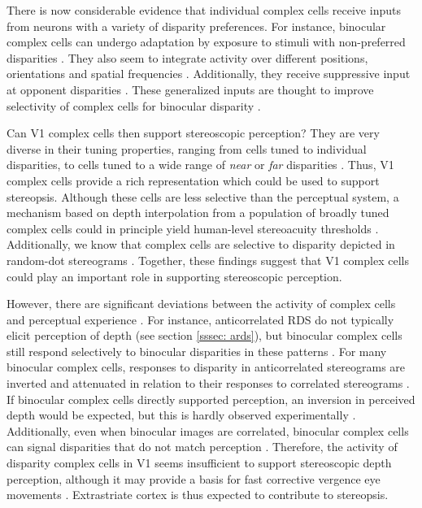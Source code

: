 There is now considerable evidence that individual complex cells receive inputs from neurons with a variety of disparity preferences. For instance, binocular complex cells can undergo adaptation by exposure to stimuli with non-preferred disparities \cite{Duong:2011fk}. They also seem to integrate activity over different positions, orientations and spatial frequencies \cite{Sasaki:2010pi,Baba:2015ij,Kato:2016fk}. Additionally, they receive suppressive input at opponent disparities \cite{Tanabe:2014ud,Tanabe:2011pt,Haefner:2008jg}. These generalized inputs are thought to improve selectivity of complex cells for binocular disparity \cite{Haefner:2008jg,Tanabe:2011pt,Kato:2016fk}.

Can V1 complex cells then support stereoscopic perception? They are very diverse in their tuning properties, ranging from cells tuned to individual disparities, to cells tuned to a wide range of \textit{near} or \textit{far} disparities \cite{Poggio:1977ys,Poggio:1988ij,Prince:2002uq}. Thus, V1 complex cells provide a rich representation which could be used to support stereopsis. Although these cells are less selective than the perceptual system, a mechanism based on depth interpolation from a population of broadly tuned complex cells could in principle yield human-level stereoacuity thresholds \cite{Lehky:1990fk,Lehky1990}. Additionally, we know that complex cells are selective to disparity depicted in random-dot stereograms \cite{Poggio:1984mi,Poggio:1988ij}. Together, these findings suggest that V1 complex cells could play an important role in supporting stereoscopic perception. 

However, there are significant deviations between the activity of complex cells and perceptual experience \cite{Cumming:1997ve, Cumming:2000vn}. For instance, anticorrelated RDS do not typically elicit perception of depth (see section \ref{sssec: ards}), but binocular complex cells still respond selectively to binocular disparities in these patterns \cite{Cumming:1997ve}. For many binocular complex cells, responses to disparity in anticorrelated stereograms are inverted and attenuated in relation to their responses to correlated stereograms \cite{Cumming:1997ve,Samonds:2013cs}. If binocular complex cells directly supported perception, an inversion in perceived depth would be expected, but this is hardly observed experimentally \cite{Cumming:1998ib,Hibbard2014}. Additionally, even when binocular images are correlated, binocular complex cells can signal disparities that do not match perception \cite{Cumming:2000vn,Nienborg:2006qo,Nienborg:2014fu}. Therefore, the activity of disparity complex cells in V1 seems insufficient to support stereoscopic depth perception, although it may provide a basis for fast corrective vergence eye movements \cite{Masson:1997jq}. Extrastriate cortex is thus expected to contribute to stereopsis.


